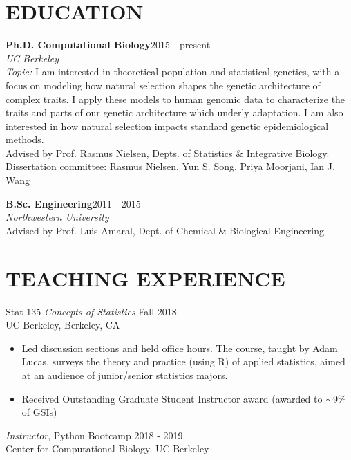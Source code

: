 \documentclass[margin, 10pt]{res} %
\begin{document}
\begin{resume}

 
\section{EDUCATION}  
{\bf Ph.D. Computational Biology}\hfill 2015 - present\\
{\sl UC Berkeley}\\
{\sl Topic:} I am interested in theoretical population and statistical genetics, with a focus on modeling how natural selection shapes the genetic architecture of complex traits. I apply these models to human genomic data to characterize the traits and parts of our genetic architecture which underly adaptation. I am also interested in how natural selection impacts standard genetic epidemiological methods.\vspace{0.1cm}\\
Advised by Prof. Rasmus Nielsen, Depts. of Statistics \& Integrative Biology.\\
Dissertation committee: Rasmus Nielsen, Yun S. Song, Priya Moorjani, Ian J. Wang

{\bf B.Sc. Engineering}\hfill 2011 - 2015\\
{\sl Northwestern University}\\
Advised by Prof. Luis Amaral, Dept. of Chemical \& Biological Engineering

\section{TEACHING EXPERIENCE}
 Stat 135 {\sl Concepts of Statistics}  \hfill Fall 2018\\
UC Berkeley, Berkeley, CA\\
\begin{itemize}
\item[] Led discussion sections and held office hours. The course, taught by Adam Lucas, surveys the theory and practice (using R) of applied statistics, aimed at an audience of junior/senior statistics majors. 
\item[] Received Outstanding Graduate Student Instructor award (awarded to $\sim$9\% of GSIs)
\end{itemize} 

{\sl Instructor}, Python Bootcamp \hfill 2018 - 2019 \\
Center for Computational Biology, UC Berkeley


\end{resume}
\end{document}

